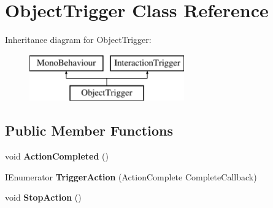 \hypertarget{class_object_trigger}{}\section{Object\+Trigger Class Reference}
\label{class_object_trigger}
Inheritance diagram for Object\+Trigger\+:\begin{figure}[H]
\begin{center}
\leavevmode
\includegraphics[height=2.000000cm]{class_object_trigger}
\end{center}
\end{figure}
\subsection*{Public Member Functions}
\begin{DoxyCompactItemize}
\item 
\mbox{\label{class_object_trigger_a43ddb62721b7a3ed1a505a0090ab0f40}} 
void {\bfseries Action\+Completed} ()
\item 
\mbox{\label{class_object_trigger_abfbb834f752e26cc6970d1d8a3b25b9a}} 
I\+Enumerator {\bfseries Trigger\+Action} (Action\+Complete Complete\+Callback)
\item 
\mbox{\label{class_object_trigger_a6add425f2f6dbbe6e0fe4e30989c1b22}} 
void {\bfseries Stop\+Action} ()
\end{DoxyCompactItemize}
